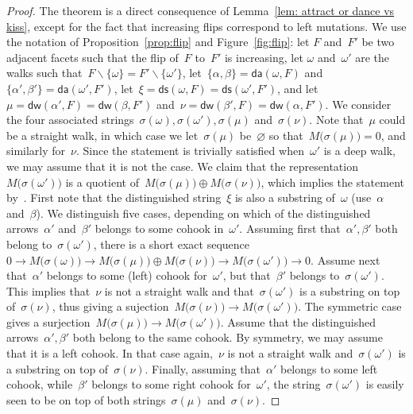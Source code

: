 \documentclass{memo-l}
\theoremstyle{definition}
\newcommand{\ssm}{\smallsetminus} %
\newcommand{\distinguishedWalk}[2]{\mathsf{dw}(#1,#2)} %
\newcommand{\distinguishedArrows}[2]{\mathsf{da}(#1,#2)} %
\newcommand{\distinguishedString}[2]{\mathsf{ds}(#1,#2)} %
\begin{document}
\begin{proof}
The theorem is a direct consequence of Lemma~\ref{lem: attract or dance vs kiss}, except for the fact that increasing flips correspond to left mutations.
We use the notation of Proposition~\ref{prop:flip} and Figure~\ref{fig:flip}: let $F$ and~$F'$ be two adjacent facets such that the flip of~$F$ to~$F'$ is increasing, let $\omega$ and~$\omega'$ are the walks such that~$F \ssm \{\omega\} = F' \ssm \{\omega'\}$, let~$\{\alpha, \beta\} = \distinguishedArrows{\omega}{F}$ and~$\{\alpha', \beta'\} = \distinguishedArrows{\omega'}{F'}$, let~$\xi = \distinguishedString{\omega}{F} = \distinguishedString{\omega'}{F'}$, and let~$\mu = \distinguishedWalk{\alpha'}{F} = \distinguishedWalk{\beta}{F'}$ and~$\nu = \distinguishedWalk{\beta'}{F} = \distinguishedWalk{\alpha}{F'}$.
We consider the four associated strings~$\sigma(\omega), \sigma(\omega'), \sigma(\mu)$ and~$\sigma(\nu)$.
Note that~$\mu$ could be a straight walk, in which case we let~$\sigma(\mu)$ be~$\varnothing$ so that~$M \big( \sigma(\mu) \big) = 0$, and similarly for~$\nu$.
Since the statement is trivially satisfied when~$\omega'$ is a deep walk, we may assume that it is not the case.
We claim that the representation~$M \big( \sigma(\omega') \big)$ is a quotient of~${M \big( \sigma(\mu) \big) \oplus M \big( \sigma(\nu) \big)}$, which implies the statement by~\mbox{\cite[Def.--Prop.~2.28]{AdachiIyamaReiten}}.
First note that the distinguished string~$\xi$ is also a substring of~$\omega$ (use~$\alpha$ and~$\beta$).
We distinguish five cases, depending on which of the distinguished arrows~$\alpha'$ and~$\beta'$ belongs to some cohook in~$\omega'$.
Assuming first that~$\alpha', \beta'$ both belong to~$\sigma(\omega')$, there is a short exact sequence~$0\rightarrow M \big( \sigma(\omega) \big) \rightarrow M \big( \sigma(\mu) \big) \oplus M \big( \sigma(\nu) \big) \rightarrow M \big( \sigma(\omega') \big) \rightarrow 0$.
Assume next that~$\alpha'$ belongs to some (left) cohook for~$\omega'$, but that~$\beta'$ belongs to~$\sigma(\omega')$.
This implies that~$\nu$ is not a straight walk and that~$\sigma(\omega')$ is a substring on top of~$\sigma(\nu)$, thus giving a sujection~$M \big( \sigma(\nu) \big) \rightarrow M \big( \sigma(\omega') \big)$.
The symmetric case gives a surjection~$M \big( \sigma(\mu) \big) \rightarrow M \big( \sigma(\omega') \big)$.
Assume that the distinguished arrows~$\alpha', \beta'$ both belong to the same cohook.
By symmetry, we may assume that it is a left cohook.
In that case again,~$\nu$ is not a straight walk and~$\sigma(\omega')$ is a substring on top of~$\sigma(\nu)$.
Finally, assuming that~$\alpha'$ belongs to some left cohook, while~$\beta'$ belongs to some right cohook for~$\omega'$, the string~$\sigma(\omega')$ is easily seen to be on top of both strings~$\sigma(\mu)$ and~$\sigma(\nu)$.
\end{proof}
\end{document}
